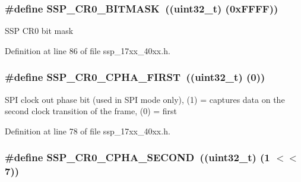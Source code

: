 \subsubsection[{\texorpdfstring{S\+S\+P\+\_\+\+C\+R0\+\_\+\+B\+I\+T\+M\+A\+SK}{SSP_CR0_BITMASK}}]{\setlength{\rightskip}{0pt plus 5cm}\#define S\+S\+P\+\_\+\+C\+R0\+\_\+\+B\+I\+T\+M\+A\+SK~((uint32\+\_\+t) (0x\+F\+F\+F\+F))}\hypertarget{group__SSP__17XX__40XX_ga90be93bebdbdfee011d90ea6e054260a}{}\label{group__SSP__17XX__40XX_ga90be93bebdbdfee011d90ea6e054260a}
S\+SP C\+R0 bit mask 

Definition at line 86 of file ssp\+\_\+17xx\+\_\+40xx.\+h.

\subsubsection[{\texorpdfstring{S\+S\+P\+\_\+\+C\+R0\+\_\+\+C\+P\+H\+A\+\_\+\+F\+I\+R\+ST}{SSP_CR0_CPHA_FIRST}}]{\setlength{\rightskip}{0pt plus 5cm}\#define S\+S\+P\+\_\+\+C\+R0\+\_\+\+C\+P\+H\+A\+\_\+\+F\+I\+R\+ST~((uint32\+\_\+t) (0))}\hypertarget{group__SSP__17XX__40XX_gaee3465bdb33add1970f6ce7f7bc638c4}{}\label{group__SSP__17XX__40XX_gaee3465bdb33add1970f6ce7f7bc638c4}
S\+PI clock out phase bit (used in S\+PI mode only), (1) = captures data on the second clock transition of the frame, (0) = first 

Definition at line 78 of file ssp\+\_\+17xx\+\_\+40xx.\+h.

\subsubsection[{\texorpdfstring{S\+S\+P\+\_\+\+C\+R0\+\_\+\+C\+P\+H\+A\+\_\+\+S\+E\+C\+O\+ND}{SSP_CR0_CPHA_SECOND}}]{\setlength{\rightskip}{0pt plus 5cm}\#define S\+S\+P\+\_\+\+C\+R0\+\_\+\+C\+P\+H\+A\+\_\+\+S\+E\+C\+O\+ND~((uint32\+\_\+t) (1 $<$$<$ 7))}\hypertarget{group__SSP__17XX__40XX_gae4150d0b2513ff70568be15c2170c9ea}{}\label{group__SSP__17XX__40XX_gae4150d0b2513ff70568be15c2170c9ea}


